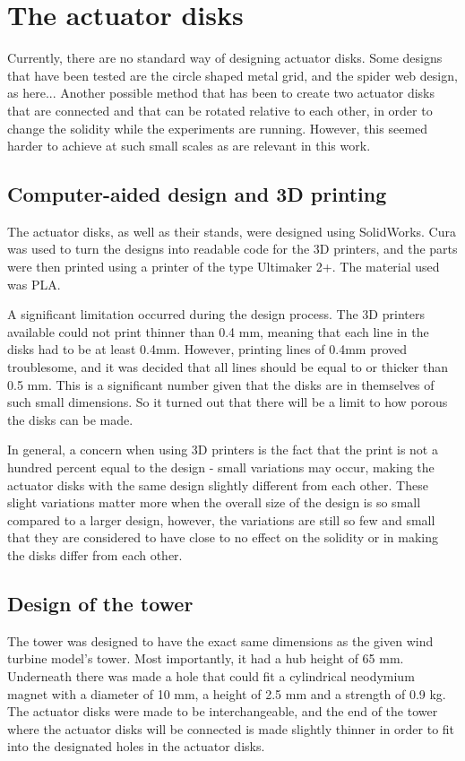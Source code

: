 \section{The actuator disks}
Currently, there are no standard way of designing actuator disks. Some designs that have been tested are the circle shaped metal grid, and the spider web design, as here... Another possible method that has been to create two actuator disks that are connected and that can be rotated relative to each other, in order to change the solidity while the experiments are running. However, this seemed harder to achieve at such small scales as are relevant in this work.


\subsection{Computer-aided design and 3D printing}
The actuator disks, as well as their stands, were designed using SolidWorks. Cura was used to turn the designs into readable code for the 3D printers, and the parts were then printed using a printer of the type Ultimaker 2+. The material used was PLA.

A significant limitation occurred during the design process. The 3D printers available could not print thinner than 0.4 mm, meaning that each line in the disks had to be at least 0.4mm. However, printing lines of 0.4mm proved troublesome, and it was decided that all lines should be equal to or thicker than 0.5 mm. This is a significant number given that the disks are in themselves of such small dimensions. So it turned out that there will be a limit to how porous the disks can be made. 

In general, a concern when using 3D printers is the fact that the print is not a hundred percent equal to the design - small variations may occur, making the actuator disks with the same design slightly different from each other. These slight variations matter more when the overall size of the design is so small compared to a larger design, however, the variations are still so few and small that they are considered to have close to no effect on the solidity or in making the disks differ from each other. 

\subsection{Design of the tower}
The tower was designed to have the exact same dimensions as the given wind turbine model's tower. Most importantly, it had a hub height of 65 mm. Underneath there was made a hole that could fit a cylindrical neodymium magnet with a diameter of 10 mm, a height of 2.5 mm and a strength of 0.9 kg. The actuator disks were made to be interchangeable, and the end of the tower where the actuator disks will be connected is made slightly thinner in order to fit into the designated holes in the actuator disks. 

